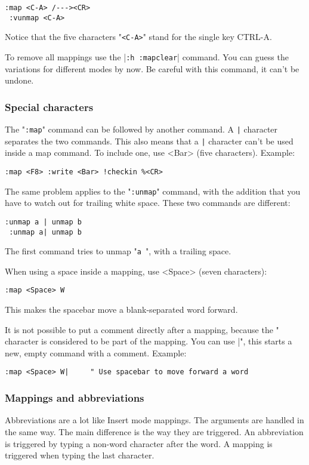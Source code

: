 {\begin{Verbatim}[samepage=true]
 :map <C-A> /---><CR>
 :vunmap <C-A>
\end{Verbatim}

Notice that the five characters "\verb!<C-A>!" stand for the single key CTRL-A.

To remove all mappings use the |\verb!:h :mapclear!| command.
You can guess the variations for different modes by now.
Be careful with this command, it can't be undone.

\subsubsection{Special characters}
The "\verb!:map!" command can be followed by another command.
A \verb!|! character separates the two commands.
This also means that a \verb!|! character can't be used inside a map command.
To include one, use <Bar> (five characters).
Example:

\begin{Verbatim}[samepage=true]
 :map <F8> :write <Bar> !checkin %<CR>
\end{Verbatim}

The same problem applies to the "\verb!:unmap!" command, with the addition that you have to watch out for trailing white space.
These two commands are different:

\begin{Verbatim}[samepage=true]
 :unmap a | unmap b
 :unmap a| unmap b
\end{Verbatim}

The first command tries to unmap "\verb!a !", with a trailing space.

When using a space inside a mapping, use <Space> (seven characters):

\begin{Verbatim}[samepage=true]
 :map <Space> W
\end{Verbatim}

This makes the spacebar move a blank-separated word forward.

It is not possible to put a comment directly after a mapping, because the " character is considered to be part of the mapping.
You can use |", this starts a new, empty command with a comment.
Example:

\begin{Verbatim}[samepage=true]
 :map <Space> W|     " Use spacebar to move forward a word
\end{Verbatim}
\subsubsection{Mappings and abbreviations}
Abbreviations are a lot like Insert mode mappings.
The arguments are handled in the same way.
The main difference is the way they are triggered.
An abbreviation is triggered by typing a non-word character after the word.
A mapping is triggered when typing the last character.

}
